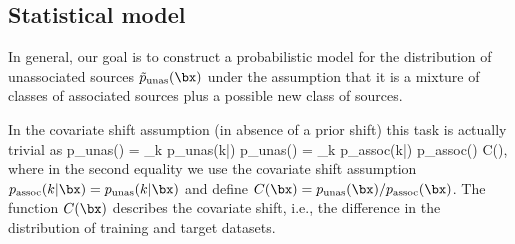 \subsection{Statistical model}
\label{sec:stat-model}

In general, our goal is to construct a probabilistic model for the distribution of unassociated sources $\tilde{p}_\textrm{unas}(\bx)$ under the assumption that it is a mixture of classes of associated sources plus a possible new class of sources.

In the covariate shift assumption (in absence of a prior shift) this task is actually trivial as
\be
\label{eq:cov0}
p_\textrm{unas}(\bx) 
= \sum_k p_\textrm{unas}(k|\bx) p_\textrm{unas}(\bx) 
= \sum_k p_\textrm{assoc}(k|\bx) p_\textrm{assoc}(\bx) C(\bx),
\ee
where in the second equality we use the covariate shift assumption $p_\textrm{assoc}(k|\bx) = p_\textrm{unas}(k|\bx)$ and define $C(\bx) = p_\textrm{unas}(\bx) / p_\textrm{assoc}(\bx)$.
The function $C(\bx)$ describes the covariate shift, i.e., the difference in the distribution of training and target datasets.

